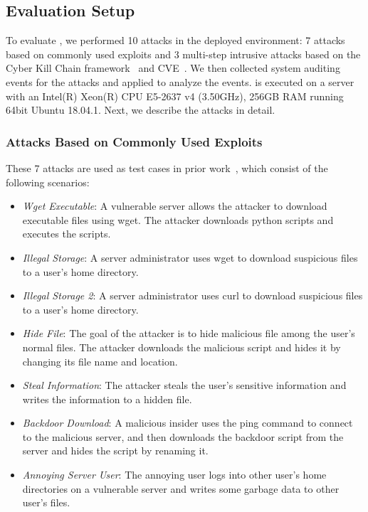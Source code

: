 

\subsection{Evaluation Setup}
\label{subsec:evalsetup}
To evaluate \tool, we performed 10 attacks in the deployed environment: 7 attacks based on commonly used exploits and 3 multi-step intrusive attacks based on the Cyber Kill Chain framework~\cite{cyberkillchain} and CVE~\cite{cve}.
We then collected system auditing events for the attacks and applied \tool to analyze the events. 
\tool is executed on a server with an Intel(R) Xeon(R) CPU E5-2637 v4 (3.50GHz), 256GB RAM running 64bit Ubuntu 18.04.1.
Next, we describe the attacks in detail.



\subsubsection{Attacks Based on Commonly Used Exploits}
\label{subsub:benign-cases}
These 7 attacks are used as test cases in prior work~\cite{exploitdb,liu2018priotracker,kwon2018mci,reduction},
which consist of the following scenarios: 
\begin{itemize}
    \item \textit{Wget Executable}: A vulnerable server allows the attacker to download executable files using wget. The attacker downloads python scripts and executes the scripts.
    \item \textit{Illegal Storage}: A server administrator uses wget to download suspicious files to a user's home directory.
    \item \textit{Illegal Storage 2}: A server administrator uses curl to download suspicious files to a user's home directory.
    \item \textit{Hide File}: The goal of the attacker is to hide malicious file among the user's normal files. The attacker downloads the malicious script and hides it by changing its file name and location.
    \item \textit{Steal Information}: The attacker steals the user's sensitive information and writes the information to a hidden file.
    \item \textit{Backdoor Download}: A malicious insider uses the ping command to connect to the malicious server, and then downloads the backdoor script from the server and hides the script by renaming it.
    \item \textit{Annoying Server User}: 
    The annoying user logs into other user's home directories on a vulnerable server and writes some garbage data to other user's files. 
\end{itemize}


